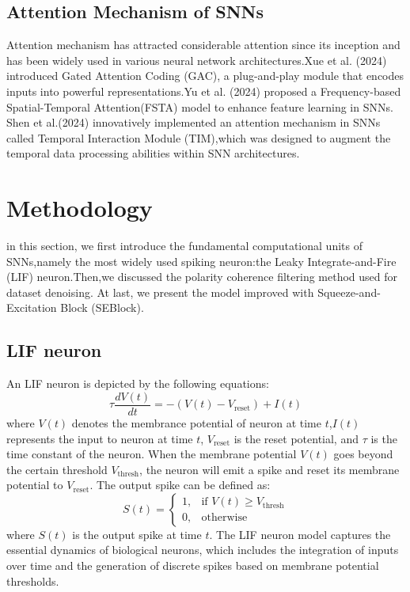 \documentclass[conference]{IEEEtran}
\begin{document}
\subsection{Attention Mechanism of SNNs}
Attention mechanism has attracted considerable attention since its inception and has been widely used in various neural network architectures.Xue et al. (2024) introduced Gated Attention Coding (GAC)\cite{qiu2024}, a plug-and-play module that encodes inputs into powerful representations.Yu et al. (2024) proposed a Frequency-based Spatial-Temporal Attention(FSTA) model to enhance feature learning in SNNs.\cite{yu2025}  Shen et al.(2024) innovatively implemented an attention mechanism in SNNs called Temporal Interaction Module (TIM),which was designed to augment the temporal data processing abilities within SNN architectures.\cite{shen2024}


\section{Methodology}
in this section, we first introduce the fundamental computational units of SNNs,namely the most widely used spiking neuron:the Leaky Integrate-and-Fire (LIF) neuron\cite{10.5555/2728336.2728412}.Then,we discussed the polarity coherence filtering method used for dataset denoising. At last, we present the model improved with Squeeze-and-Excitation Block (SEBlock).\cite{hu2019}
\subsection{LIF neuron}
An LIF neuron is depicted by the following equations:
\begin{equation}
\tau \frac{dV(t)}{dt} = -\left(V(t) - V_{\text{reset}}\right) + I(t)
\end{equation}
where $V(t)$ denotes the membrance potential of neuron at time $t$,$I(t)$ represents the input to neuron at time $t$, $V_{\text{reset}}$ is the reset potential, and $\tau$ is the time constant of the neuron. When the membrane potential $V(t)$ goes beyond the certain threshold $V_{\text{thresh}}$, the neuron will emit a spike and reset its membrane potential to $V_{\text{reset}}$. The output spike can be defined as:
\begin{equation}
S(t) = \begin{cases}
1, & \text{if } V(t) \geq V_{\text{thresh}} \\
0, & \text{otherwise}
\end{cases}
\end{equation}
where $S(t)$ is the output spike at time $t$. The LIF neuron model captures the essential dynamics of biological neurons, which includes the integration of inputs over time and the generation of discrete spikes based on membrane potential thresholds.
\end{document}

